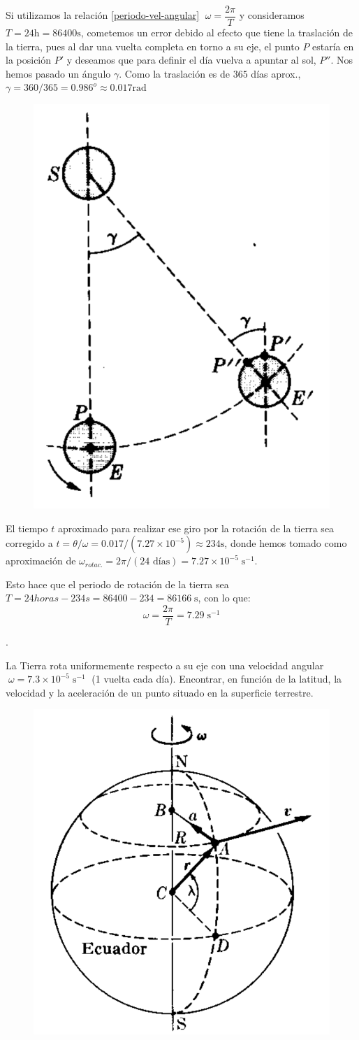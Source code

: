 \begin{multicols}{2}
Si utilizamos la relación \ref{periodo-vel-angular} $\;\omega=\dfrac {2\pi}T$ y consideramos $T=24\mathrm{h}=86400 \mathrm{s}$, cometemos un error debido al efecto que tiene la traslación de la tierra, pues al dar una vuelta completa en torno a su eje, el punto $P$ estaría en la posición $P'$ y deseamos que para definir el día vuelva a apuntar al sol, $P''$. Nos hemos pasado un ángulo $\gamma$. Como la traslación es de $365$ días aprox., $\gamma=360/365 =0.986^o\approx 0.017 \text{rad}$
\begin{figure}[H]
		\centering
		\includegraphics[width=.25\textwidth]{imagenes/imagenes02/T02IM18.png}
		\end{figure}
\end{multicols}

El tiempo $t$ aproximado para realizar ese giro por la rotación de la tierra sea corregido a  $t=\theta / \omega= 0.017 / (7.27\times 10^{-5}) \approx 234 \mathrm{s}$, donde hemos tomado como aproximación de $\omega_{rotac.}=2\pi / (24 \text{ días})=7.27\times 10^{-5}\; \mathrm{s}^{-1}$.

Esto hace que el periodo de rotación de la tierra sea $T=24horas - 234 s= 86400-234=86166\; \mathrm{s}$, con lo que:
$$\omega=\displaystyle \dfrac {2\pi}T=7.29\; \mathrm{s}^{-1}$$

\begin{prob}.

	\begin{multicols}{2}
La Tierra rota uniformemente respecto a su eje con una velocidad angular $\;\omega=7.3 \times 10^{-5}\;\mathrm{s}^{-1}\;$ (1 vuelta cada día). Encontrar, en función de la latitud, la velocidad y la aceleración de un punto situado en la superficie terrestre.
\begin{figure}[H]
		\centering
		\includegraphics[width=.25\textwidth]{imagenes/imagenes02/T02IM17.png}
		\end{figure}
\end{multicols}
\end{prob}

